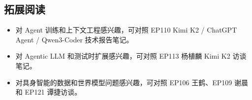 \documentclass[a4paper]{article}
\begin{document}
\subsection{拓展阅读}

\begin{itemize}
\item 对 Agent 训练和上下文工程感兴趣，可对照 EP110 Kimi K2 / ChatGPT Agent / Qwen3-Coder 技术报告笔记。
\item 对 Agentic LLM 和测试时扩展感兴趣，可对照 EP113 杨植麟 Kimi K2 访谈笔记。
\item 对具身智能的数据和世界模型问题感兴趣，可对照 EP106 王鹤、EP109 谢晨和 EP121 谭捷访谈。
\end{itemize}
\end{document}
